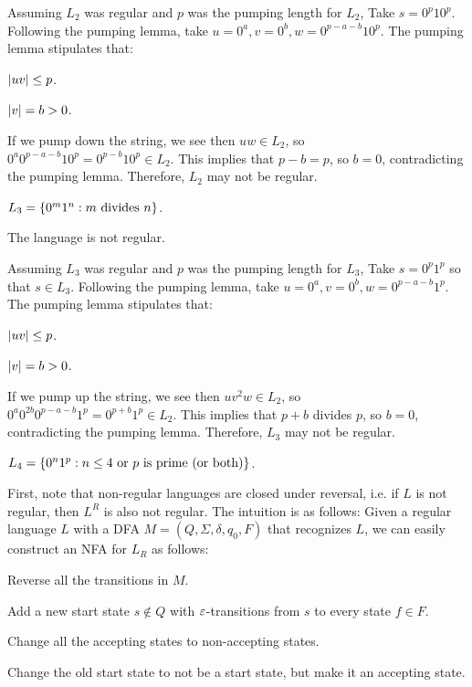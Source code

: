 \begin{problem}
\begin{enumalph}
\begin{Answer}
        \step
        Assuming $L_2$ was regular and $p$ was the pumping length for $L_2$,
        Take $s = 0^p10^p$.
        Following the pumping lemma, take $u = 0^a, v = 0^b, w = 0^{p-a-b}10^p$.
        The pumping lemma stipulates that:
        \begin{enumroman}
          \item $\lvert uv\rvert \le p$.
          \item $\lvert v\rvert = b > 0$.
        \end{enumroman}
        If we pump down the string, we see then $uw \in L_2$,
        so $0^a0^{p-a-b}10^p = 0^{p-b}10^p \in L_2$.
        This implies that $p - b = p$, so $b = 0$,
        contradicting the pumping lemma.
        Therefore, $L_2$ may not be regular.
      \end{Answer}
    \item $L_3 = \left\{0^m 1^n : m \text{ divides } n\right\}$.
      \begin{Answer}
        The language is not regular.

        \step
        Assuming $L_3$ was regular and $p$ was the pumping length for $L_3$,
        Take $s = 0^p1^p$ so that $s \in L_3$.
        Following the pumping lemma, take $u = 0^a, v = 0^b, w = 0^{p-a-b}1^p$.
        The pumping lemma stipulates that:
        \begin{enumroman}
          \item $\lvert uv\rvert \le p$.
          \item $\lvert v\rvert = b > 0$.
        \end{enumroman}
        If we pump up the string, we see then $uv^2w \in L_2$,
        so $0^a0^{2b}0^{p-a-b}1^p = 0^{p+b}1^p \in L_2$.
        This implies that $p + b$ divides $p$, so $b = 0$,
        contradicting the pumping lemma.
        Therefore, $L_3$ may not be regular.
      \end{Answer}
    \item $L_4 = \left\{0^n 1^p : n \le 4 \text{ or $p$ is prime (or both)}\right\}$.
      \begin{Answer}
        First, note that non-regular languages are closed under reversal,
        i.e. if $L$ is not regular, then $L^R$ is also not regular.
        The intuition is as follows:
        Given a regular language $L$ with a DFA $M = (Q, \Sigma, \delta, q_0, F)$ that recognizes $L$,
        we can easily construct an NFA for $L_R$ as follows:
        \begin{enumroman}
          \item Reverse all the transitions in $M$.
          \item Add a new start state $s \notin Q$ with $\varepsilon$-transitions
          from $s$ to every state $f \in F$.
          \item Change all the accepting states to non-accepting states.
          \item Change the old start state to not be a start state, but make it an accepting state.
        \end{enumroman}


\end{Answer}
\end{enumalph}
\end{problem}
